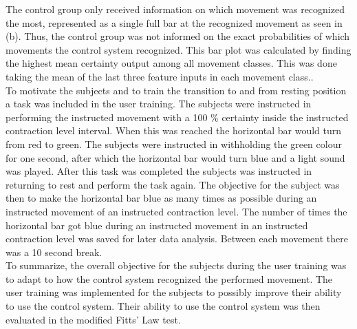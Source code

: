 The control group only received information on which movement was recognized the most, represented as a single full bar at the recognized movement as seen in  (b). Thus, the control group was not informed on the exact probabilities of which movements the control system recognized. This bar plot was calculated by finding the highest mean certainty output among all movement classes. This was done taking the mean of the last three feature inputs in each movement class.. \\
To motivate the subjects and to train the transition to and from resting position a task was included in the user training. The subjects were instructed in performing the instructed movement with a 100 \% certainty inside the instructed contraction level interval. When this was reached the horizontal bar would turn from red to green. The subjects were instructed in withholding the green colour for one second, after which the horizontal bar would turn blue and a light sound was played. After this task was completed the subjects was instructed in returning to rest and perform the task again. The objective for the subject was then to make the horizontal bar blue as many times as possible during an instructed movement of an instructed contraction level. The number of times the horizontal bar got blue during an instructed movement in an instructed contraction level was saved for later data analysis. Between each movement there was a 10 second break. \\
To summarize, the overall objective for the subjects during the user training was to adapt to how the control system recognized the performed movement. The user training was implemented for the subjects to possibly improve their ability to use the control system. Their ability to use the control system was then evaluated in the modified Fitts' Law test. 











 







